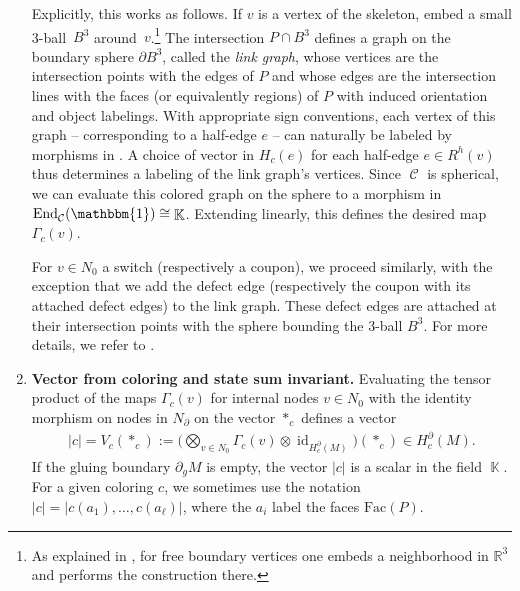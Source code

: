 \documentclass[pdftex]{sigma}
\DeclareMathOperator{\id}{id}
\DeclareMathOperator{\End}{End}
\DeclareMathOperator{\Hom}{Hom}
\DeclareMathOperator{\K}{\mathbb{K}}
\DeclareMathOperator{\calc}{\mathcal{C}}
\numberwithin{equation}{section}
\theoremstyle{definition}
\begin{document}
\begin{enumerate}
 Explicitly, this works as follows. If $v$ is a vertex of the skeleton, embed a small 3-ball~$B^3$ around~$v$.\footnote{As explained in \cite{F}, for free boundary vertices one embeds a neighborhood in $\mathbb{R}^3$ and performs the construction there.} The intersection $P \cap B^3$ defines a graph on the boundary sphere $\partial B^3$, called the \textit{link graph}, whose vertices are the intersection points with the edges of $P$ and whose edges are the intersection lines with the faces (or equivalently regions) of $P$ with induced orientation and object labelings. With appropriate sign conventions, each vertex of this graph -- corresponding to a half-edge $e$ -- can naturally be labeled by morphisms in \smash{$H_c(e) = \Hom_{\calc}\bigl(\mathbbm{1}, x_1^{\varepsilon(1)} \otimes \dots \otimes x_k^{\varepsilon(k)}\bigr)$}. A choice of vector in $H_c(e)$ for each half-edge $e \in R^h(v)$ thus determines a labeling of the link graph's vertices. Since $\calc$ is spherical, we can evaluate this colored graph on the sphere to a morphism in $\End_{\calc}(\mathbbm{1}) \cong \K$. Extending linearly, this defines the desired map $\Gamma_c(v)$.

 For $v \in N_0$ a switch (respectively a coupon), we proceed similarly, with the exception that we add the defect edge (respectively the coupon with its attached defect edges) to the link graph. These defect edges are attached at their intersection points with the sphere bounding the 3-ball $B^3$. For more details, we refer to \cite[Section~15.5.1]{TV}.

 \item \textbf{Vector from coloring and state sum invariant.} Evaluating the tensor product of the maps $\Gamma_c(v)$ for internal nodes $v \in N_0$ with the identity morphism on nodes in $N_{\partial}$ on the vector $*_c$ defines a vector
 \begin{align}
 \label{eqCol}
 |c| = V_c(*_c) := \biggl(\bigotimes_{v \in N_0}\Gamma_c(v) \otimes \id_{H_c^{\partial}(M)} \biggr)(*_c) \in H_c^{\partial}(M).
 \end{align}
 If the gluing boundary $\partial_gM$ is empty, the vector $|c|$ is a scalar in the field $\K$. For a given coloring $c$, we sometimes use the notation $|c| = |c(a_1), \dots, c(a_{\ell})|$, where the $a_i$ label the faces $\mathrm{Fac}(P)$.


\end{enumerate}
\end{document}
